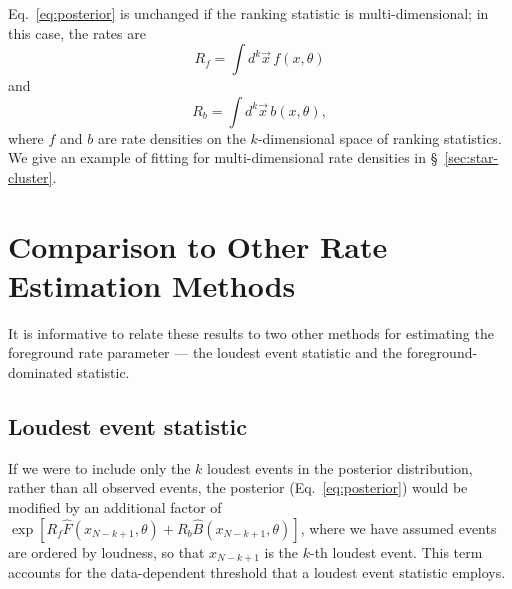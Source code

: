 \documentclass[aps,prd,reprint,nofootinbib]{revtex4-1}
\begin{document}
Eq.~\eqref{eq:posterior} is unchanged if the ranking statistic is
multi-dimensional; in this case, the rates are
\begin{equation}
  R_f = \int d^k \vec{x} \, f(x, \theta)
\end{equation}
and
\begin{equation}
  R_b = \int d^k \vec{x} \, b(x, \theta),
\end{equation}
where $f$ and $b$ are rate densities on the $k$-dimensional space of
ranking statistics.  We give an example of fitting for
multi-dimensional rate densities in \S~\ref{sec:star-cluster}.

\section{Comparison to Other Rate Estimation Methods}

It is informative to relate these results to two other methods for
estimating the foreground rate parameter --- the loudest event
statistic and the foreground-dominated statistic.

\subsection{Loudest event statistic}
If we were to include only the $k$ loudest events in the posterior
distribution, rather than all observed events, the posterior
(Eq.~\eqref{eq:posterior}) would be modified by an additional factor
of $\exp[R_f \hat{F}(x_{N-k+1},\theta) + R_b
  \hat{B}(x_{N-k+1},\theta)]$, where we have assumed events are
ordered by loudness, so that $x_{N-k+1}$ is the $k$-th loudest
event. This term accounts for the data-dependent threshold that a
loudest event statistic employs.
\end{document}
